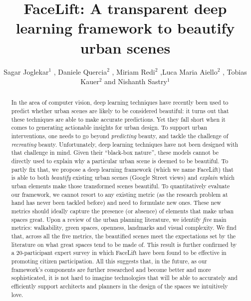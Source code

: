 \documentclass[]{rsos}%
\begin{document}
\title[FaceLift]{FaceLift: A transparent deep learning framework to beautify urban scenes}



\author{%
    Sagar Joglekar$^{1}$ , Daniele Quercia$^{2}$ , Miriam Redi$^{2}$ ,Luca Maria Aiello$^{2}$ , Tobias Kauer$^{2}$ and Nishanth Sastry$^{1}$ }


\address{$^{1}$King's College, London, UK\\
        $^{2}$Nokia Bell labs, Cambridge, UK}

\subject{Urban Informatics, Machine learning, Computer Science}



\begin{abstract}
In the area of computer vision, deep learning techniques have recently been used to predict whether urban scenes are likely to be considered beautiful:  it turns out that these techniques are able to make accurate predictions. Yet they fall short when it comes to generating actionable insights for urban design. To support urban interventions, one needs to go beyond \emph{predicting} beauty, and tackle the challenge of \emph{recreating} beauty. Unfortunately, deep learning techniques have not been designed with that challenge in mind. Given their ``black-box nature'', these models cannot be directly used to explain why a particular urban scene is deemed to be beautiful. To partly fix that, we propose a deep learning framework (which we name  FaceLift) that is able to both \emph{beautify} existing urban scenes (Google Street views) and \emph{explain} which urban elements make those transformed scenes beautiful. To quantitatively evaluate our framework, we cannot resort to any existing metric (as the research problem at hand has never been tackled before) and need to  formulate new ones. These new metrics should ideally capture the presence (or absence) of elements that make urban spaces great.  Upon a review of the urban planning literature, we identify \textsl{five} main metrics: walkability, green spaces, openness, landmarks and visual complexity.  We find that, across all the five metrics, the beautified scenes meet the expectations set by the literature on what great spaces tend to be made of. This result is further confirmed by a 20-participant expert survey in which FaceLift have been found to be effective in promoting citizen participation. All this suggests that, in the future, as our framework's components are further researched and become better and more sophisticated, it is not hard to imagine technologies that will be able to accurately and efficiently support architects and planners in the design of the spaces we intuitively love.
\end{abstract}
\end{document}
